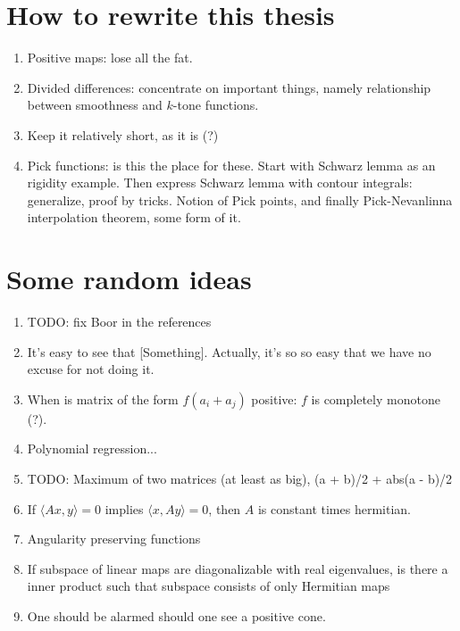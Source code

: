 \section{How to rewrite this thesis}

\begin{enumerate}
	\item Positive maps: lose all the fat.
	\item Divided differences: concentrate on important things, namely relationship between smoothness and $k$-tone functions.
	\item Keep it relatively short, as it is (?)
	\item Pick functions: is this the place for these. Start with Schwarz lemma as an rigidity example. Then express Schwarz lemma with contour integrals: generalize, proof by tricks. Notion of Pick points, and finally Pick-Nevanlinna interpolation theorem, some form of it.
\end{enumerate}

\section{Some random ideas}
\begin{enumerate}
	\item TODO: fix Boor in the references
	\item It's easy to see that [Something]. Actually, it's so so easy that we have no excuse for not doing it.
	\item When is matrix of the form $f(a_{i} + a_{j})$ positive: $f$ is completely monotone (?).
	\item Polynomial regression...
	\item TODO: Maximum of two matrices (at least as big), (a + b)/2 + abs(a - b)/2
	\item If $\langle A x, y \rangle = 0$ implies $\langle x, A y \rangle = 0$, then $A$ is constant times hermitian.
	\item Angularity preserving functions
	\item If subspace of linear maps are diagonalizable with real eigenvalues, is there a inner product such that subspace consists of only Hermitian maps
	\item One should be alarmed should one see a positive cone.
\end{enumerate}


